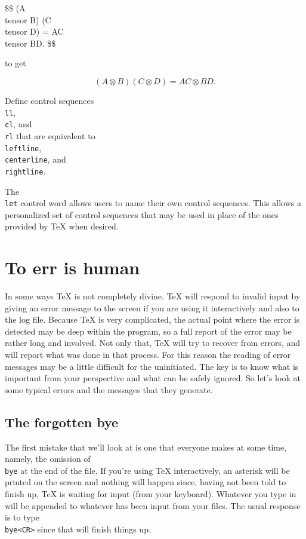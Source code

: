  
\let\tensor=\otimes 
\beginuser 
\$\$ (A \\tensor B) (C \\tensor D) = AC \\tensor BD. \$\$ 
\enduser 
 
\noindent to get 
 
$$ (A \tensor B) (C \tensor D) = AC \tensor BD. $$ 
 
 
 
\exercise Define control sequences {\tt \\ll}, {\tt \\cl}, and 
{\tt \\rl} that are equivalent to {\tt \\leftline}, {\tt \\centerline}, 
and {\tt \\rightline}. 
 
The {\tt \\let} control word allows users to name their own 
control sequences.  This allows a personalized set of control 
sequences that may be used in place of the ones provided by \TeX{} 
when desired. 
 
\section{To err is human} 
 
In some ways \TeX{} is not completely divine. \TeX{} will respond 
to invalid input by giving an error message to the screen if you 
are using it interactively and also to the log file.  Because 
\TeX{} is very complicated, the actual point where the error is 
detected may be deep within the program, so a full report of the 
error may be rather long and involved.    Not only that, \TeX{} 
will try to recover from errors, and will report what was done in 
that process.  For this reason the reading of error messages may 
be a little difficult for the uninitiated.  The key is to know 
what is important from your perspective and what can be safely 
ignored. So let's look at some typical errors and the messages 
that they generate. 
 
\subsection{The forgotten bye} 
 
The first mistake that we'll look at is one that everyone makes 
at some time, namely, the omission of {\tt \\bye} at the end of 
the file. If you're using \TeX{} interactively, an asterisk \hfil 
\break 
\leftline{\tt *} 
will be printed on the screen and nothing will happen since, 
having not been told to finish up,  \TeX{} is waiting for input 
(from your keyboard).  Whatever you type in will be appended to 
whatever has been input from your files.  The usual response is 
to type {\tt \\bye<CR>} since that will 
finish things up. 
 
